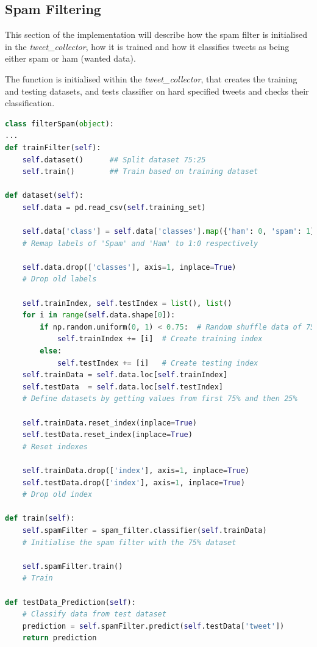 \documentclass[oneside, 12pt]{article}
\begin{document}
		\subsection{Spam Filtering}
			This section of the implementation will describe how the spam filter is initialised in the \textit{tweet\_collector}, how it is trained and how it classifies tweets as being either spam or ham (wanted data).
			
			The function is initialised within the \textit{tweet\_collector}, that creates the training and testing datasets, and tests classifier on hard specified tweets and checks their classification.
			
			\begin{lstlisting}[language=python, caption=Spam filter training Class - \textit{tweet\_collector.py}]			
class filterSpam(object):		
...		
def trainFilter(self):
	self.dataset()		## Split dataset 75:25
	self.train()		## Train based on training dataset
			
def dataset(self):
	self.data = pd.read_csv(self.training_set)
			
	self.data['class'] = self.data['classes'].map({'ham': 0, 'spam': 1})
	# Remap labels of 'Spam' and 'Ham' to 1:0 respectively
			
	self.data.drop(['classes'], axis=1, inplace=True)
	# Drop old labels
			
	self.trainIndex, self.testIndex = list(), list()
	for i in range(self.data.shape[0]):
		if np.random.uniform(0, 1) < 0.75:	# Random shuffle data of 75%
			self.trainIndex += [i]	# Create training index
		else:
			self.testIndex += [i]	# Create testing index
	self.trainData = self.data.loc[self.trainIndex]
	self.testData  = self.data.loc[self.testIndex]
	# Define datasets by getting values from first 75% and then 25%
			
	self.trainData.reset_index(inplace=True)
	self.testData.reset_index(inplace=True)		
	# Reset indexes
			
	self.trainData.drop(['index'], axis=1, inplace=True)
	self.testData.drop(['index'], axis=1, inplace=True)
	# Drop old index
			
def train(self):
	self.spamFilter = spam_filter.classifier(self.trainData)
	# Initialise the spam filter with the 75% dataset
			
	self.spamFilter.train()
	# Train
			
def testData_Prediction(self):
	# Classify data from test dataset
	prediction = self.spamFilter.predict(self.testData['tweet'])	
	return prediction
			

\end{lstlisting}
\end{document}
